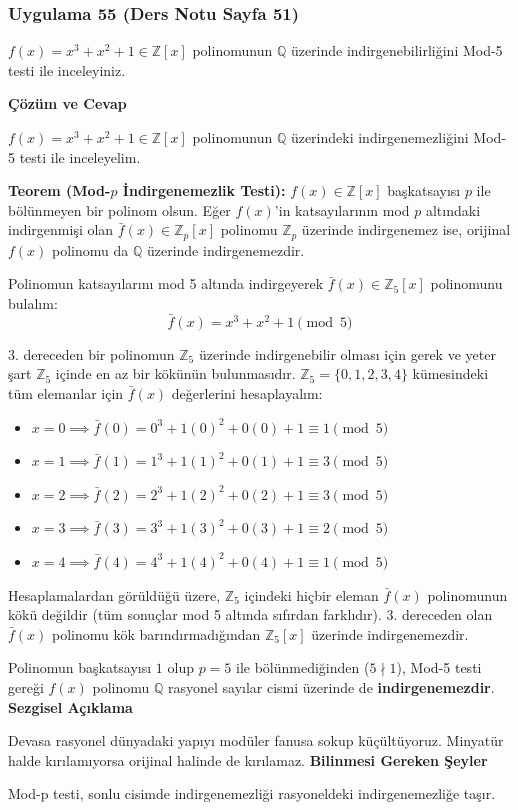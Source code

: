 \documentclass[11pt, a4paper]{article}
\newenvironment{cozum}{
    \vspace{0.5cm}
    \noindent\textcolor{green!60!black}{\faCheckCircle\enspace \textbf{\Large Çözüm ve Cevap}}\par\vspace{0.2cm}
}{}
\newenvironment{sezgisel}{
    \vspace{0.5cm}
    \noindent\textcolor{orange!80!black}{\faLightbulb\enspace \textbf{\Large Sezgisel Açıklama}}\par\vspace{0.2cm}
    \itshape
}{}
\newenvironment{bilgi}{
    \vspace{0.5cm}
    \noindent\textcolor{red!70!black}{\faExclamationTriangle\enspace \textbf{\Large Bilinmesi Gereken Şeyler}}\par\vspace{0.2cm}
}{}
\begin{document}
\newpage
\subsubsection{Uygulama 55 (Ders Notu Sayfa 51)}
\begin{sorubox}
$f(x)=x^3+x^2+1 \in \mathbb{Z}[x]$ polinomunun $\mathbb{Q}$ üzerinde indirgenebilirliğini Mod-5 testi ile inceleyiniz.
\end{sorubox}
\begin{cozum}
$f(x) = x^{3} + x^{2} + 1 \in \mathbb{Z}[x]$ polinomunun $\mathbb{Q}$ üzerindeki indirgenemezliğini Mod-5 testi ile inceleyelim.

\textbf{Teorem (Mod-$p$ İndirgenemezlik Testi):} $f(x) \in \mathbb{Z}[x]$ başkatsayısı $p$ ile bölünmeyen bir polinom olsun. Eğer $f(x)$'in katsayılarının mod $p$ altındaki indirgenmişi olan $\bar{f}(x) \in \mathbb{Z}_p[x]$ polinomu $\mathbb{Z}_p$ üzerinde indirgenemez ise, orijinal $f(x)$ polinomu da $\mathbb{Q}$ üzerinde indirgenemezdir.

Polinomun katsayılarını mod 5 altında indirgeyerek $\bar{f}(x) \in \mathbb{Z}_{5}[x]$ polinomunu bulalım:
\[ \bar{f}(x) = x^{3} + x^{2} + 1 \pmod{5} \]

3. dereceden bir polinomun $\mathbb{Z}_{5}$ üzerinde indirgenebilir olması için gerek ve yeter şart $\mathbb{Z}_{5}$ içinde en az bir kökünün bulunmasıdır. $\mathbb{Z}_{5} = \{0, 1, 2, 3, 4\}$ kümesindeki tüm elemanlar için $\bar{f}(x)$ değerlerini hesaplayalım:
\begin{itemize}
    \item $x = 0 \implies \bar{f}(0) = 0^3 + 1(0)^2 + 0(0) + 1 \equiv 1 \pmod{5}$
    \item $x = 1 \implies \bar{f}(1) = 1^3 + 1(1)^2 + 0(1) + 1 \equiv 3 \pmod{5}$
    \item $x = 2 \implies \bar{f}(2) = 2^3 + 1(2)^2 + 0(2) + 1 \equiv 3 \pmod{5}$
    \item $x = 3 \implies \bar{f}(3) = 3^3 + 1(3)^2 + 0(3) + 1 \equiv 2 \pmod{5}$
    \item $x = 4 \implies \bar{f}(4) = 4^3 + 1(4)^2 + 0(4) + 1 \equiv 1 \pmod{5}$
\end{itemize}

Hesaplamalardan görüldüğü üzere, $\mathbb{Z}_{5}$ içindeki hiçbir eleman $\bar{f}(x)$ polinomunun kökü değildir (tüm sonuçlar mod 5 altında sıfırdan farklıdır). 3. dereceden olan $\bar{f}(x)$ polinomu kök barındırmadığından $\mathbb{Z}_{5}[x]$ üzerinde indirgenemezdir.

Polinomun başkatsayısı $1$ olup $p = 5$ ile bölünmediğinden ($5 \nmid 1$), Mod-5 testi gereği $f(x)$ polinomu $\mathbb{Q}$ rasyonel sayılar cismi üzerinde de \textbf{indirgenemezdir}.
\end{cozum}
\begin{sezgisel}
Devasa rasyonel dünyadaki yapıyı modüler fanusa sokup küçültüyoruz. Minyatür halde kırılamıyorsa orijinal halinde de kırılamaz.
\end{sezgisel}
\begin{bilgi}
Mod-p testi, sonlu cisimde indirgenemezliği rasyoneldeki indirgenemezliğe taşır.
\end{bilgi}
\end{document}
